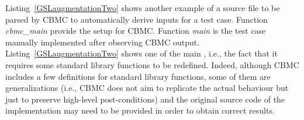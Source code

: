 Listing~\ref{GSLaugmentationTwo} shows another example of a source file to be parsed by CBMC to automatically derive inputs for a test case. Function \emph{cbmc\_main} provide the setup for CBMC. Function \emph{main} is the test case manually implemented after observing CBMC output. 
Listing~\ref{GSLaugmentationTwo} shows one of the main , i.e., the fact that it requires some standard library functions to be redefined. Indeed, although CBMC includes a few definitions for standard library functions, some of them are generalizations (i.e., CBMC does not aim to replicate the actual behaviour but just to preserve high-level post-conditions) and the original source code of the implementation may need to be provided in order to obtain correct results.









